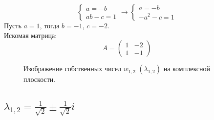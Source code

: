 \documentclass[a5paper, 10pt]{article}
\theoremstyle{definition}
\theoremstyle{plain}
\theoremstyle{remark}
\begin{document}
\begin{equation}
\begin{cases}
a = -b\\
ab - c = 1
\end{cases}
\to
\begin{cases}
a = -b\\
-a^2 - c = 1
\end{cases}
\end{equation}
Пусть $ a = 1$, тогда $b = -1$, $c = -2$.\\
Искомая матрица:
\begin{equation}
A =
\begin{pmatrix}
1 & -2 \\
1 & -1
\end{pmatrix}
\end{equation}
\begin{figure}[h!]
\caption{Изображение собственных чисел $w_{1, 2} \, \, \left( \lambda_{1, 2} \right)$ на комплексной плоскости.}
\end{figure}

\subsection{$\lambda_{1, 2} = \frac{1}{\sqrt{2}} \pm \frac{1}{\sqrt{2}} i$}
\end{document}

